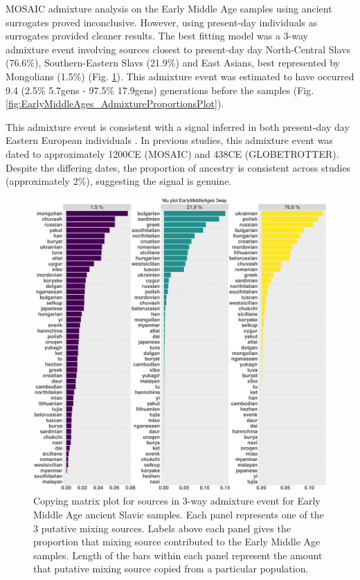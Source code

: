 MOSAIC admixture analysis on the Early Middle Age samples using ancient surrogates proved inconclusive. However, using present-day individuals as surrogates provided cleaner results. The best fitting model was a 3-way admixture event involving sources closest to present-day day North-Central Slavs (76.6\%), Southern-Eastern Slavs (21.9\%) and East Asians, best represented by Mongolians (1.5\%) (Fig. \ref{fig:EarlyMiddleAges_MOSAIC_3way_moderns_Mu}). This admixture event was estimated to have occurred 9.4 (2.5\% 5.7gens - 97.5\% 17.9gens) generations before the samples (Fig. \ref{fig:EarlyMiddleAges_AdmixtureProportionsPlot}). 

This admixture event is consistent with a signal inferred in both present-day day Eastern European individuals \cite{MOSAIC_2019, Hellenthal2014}. In previous studies, this admixture event was dated to approximately 1200CE (MOSAIC) and 438CE (GLOBETROTTER). Despite the differing dates, the proportion of ancestry is consistent across studies (approximately 2\%), suggesting the signal is genuine. 

\begin{figure}[htp]
    \centering
    \includegraphics[width=1.0\textwidth]{../images/chapter5/Mu_plot_EarlyMiddleAges_3way.pdf}
    \caption{Copying matrix plot for sources in 3-way admixture event for Early Middle Age ancient Slavic samples. Each panel represents one of the 3 putative mixing sources. Labels above each panel gives the proportion that mixing source contributed to the Early Middle Age samples. Length of the bars within each panel represent the amount that putative mixing source copied from a particular population.}
    \label{fig:EarlyMiddleAges_MOSAIC_3way_moderns_Mu}
\end{figure}

